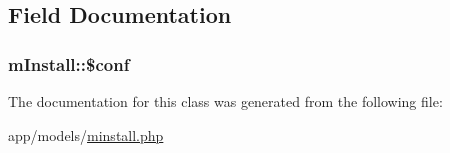 \subsection{Field Documentation}
\hypertarget{classmInstall_adde2b54a22a6aaa56b40e5e4bdc0544e}{}
\subsubsection[{\$conf}]{\setlength{\rightskip}{0pt plus 5cm}m\+Install\+::\$conf\hspace{0.3cm}{\ttfamily [protected]}}\label{classmInstall_adde2b54a22a6aaa56b40e5e4bdc0544e}


The documentation for this class was generated from the following file\+:\begin{DoxyCompactItemize}
\item 
app/models/\hyperlink{minstall_8php}{minstall.\+php}\end{DoxyCompactItemize}

